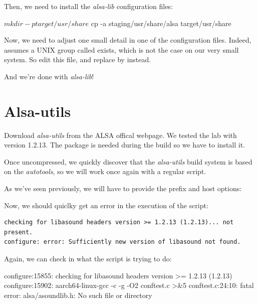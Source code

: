 Then, we need to install the {\em alsa-lib} configuration files:

\begin{bashinput}
$ mkdir -p target/usr/share
$ cp -a staging/usr/share/alsa target/usr/share
\end{bashinput}

Now, we need to adjust one small detail in one of the configuration
files. Indeed,  assumes a UNIX group
called  exists, which is not the case on our very small
system. So edit this file, and replace  by  instead.

And we're done with {\em alsa-lib}!

\section{Alsa-utils}

Download {\em alsa-utils} from the ALSA offical webpage. We tested the lab
with version 1.2.13. The  package is needed during the build
so we have to install it.


Once uncompressed, we quickly discover that the {\em alsa-utils} build
system is based on the {\em autotools}, so we will work once again
with a regular  script.

As we've seen previously, we will have to provide the prefix and host
options:


Now, we should quiclky get an error in the execution of the
 script:

\begin{verbatim}
checking for libasound headers version >= 1.2.13 (1.2.13)... not present.
configure: error: Sufficiently new version of libasound not found.
\end{verbatim}

Again, we can check in  what the 
script is trying to do:

\begin{terminaloutput}
configure:15855: checking for libasound headers version >= 1.2.13 (1.2.13)
configure:15902: aarch64-linux-gcc -c -g -O2  conftest.c >&5
conftest.c:24:10: fatal error: alsa/asoundlib.h: No such file or directory
\end{terminaloutput}
\normalsize

